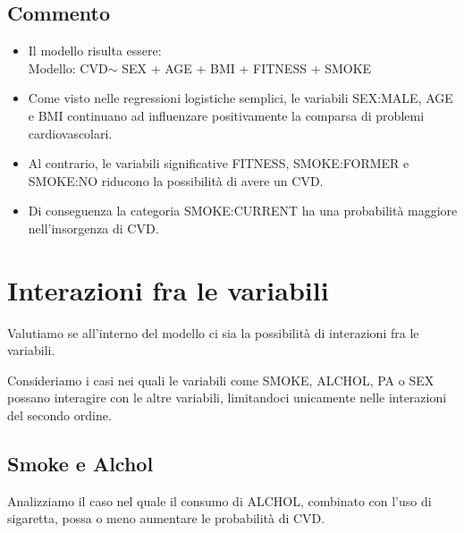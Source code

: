 \documentclass{article}\usepackage[]{graphicx}\usepackage[]{xcolor}
\begin{document}
  \subsection{Commento}
    \begin{itemize}
      \item Il modello risulta essere: \\
            Modello: CVD$\sim$ SEX + AGE + BMI + FITNESS + SMOKE
      \item Come visto nelle regressioni logistiche semplici, le variabili
            SEX:MALE, AGE e BMI continuano ad influenzare positivamente la 
            comparsa di problemi cardiovascolari.
      \item Al contrario, le variabili significative FITNESS, SMOKE:FORMER e
            SMOKE:NO riducono la possibilità di avere un CVD.
      \item Di conseguenza la categoria SMOKE:CURRENT ha una probabilità 
            maggiore nell'insorgenza di CVD.
    \end{itemize}
  
\clearpage    


\section{Interazioni fra le variabili}
  Valutiamo se all'interno del modello ci sia la possibilità di interazioni
  fra le variabili. \par
  Consideriamo i casi nei quali le variabili come SMOKE, ALCHOL, PA o SEX possano 
  interagire con le altre variabili, limitandoci unicamente nelle interazioni 
  del secondo ordine.
  
  \subsection{Smoke e Alchol}
  Analizziamo il caso nel quale il consumo di ALCHOL, combinato con l'uso di 
  sigaretta, possa o meno aumentare le probabilità di CVD.
  
\end{document}
